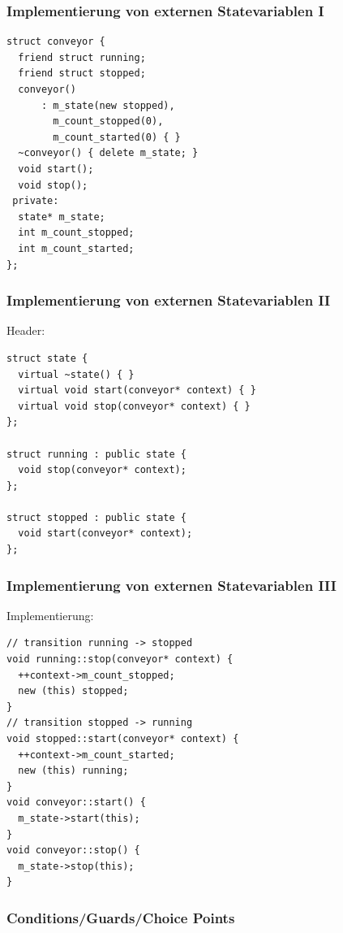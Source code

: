 \documentclass{beamer}
\begin{document}
\begin{frame}[fragile]
 \frametitle{Implementierung von externen Statevariablen I}
 \begin{lstlisting}
struct conveyor {
  friend struct running;
  friend struct stopped;
  conveyor()
      : m_state(new stopped),
        m_count_stopped(0),
        m_count_started(0) { }
  ~conveyor() { delete m_state; }
  void start();
  void stop();
 private:
  state* m_state;
  int m_count_stopped;
  int m_count_started;
};
\end{lstlisting}
\end{frame}

\begin{frame}[fragile]
  \frametitle{Implementierung von externen Statevariablen II}
  Header:
  \begin{lstlisting}
struct state {
  virtual ~state() { }
  virtual void start(conveyor* context) { }
  virtual void stop(conveyor* context) { }
};

struct running : public state {
  void stop(conveyor* context);
};

struct stopped : public state {
  void start(conveyor* context);
};
  \end{lstlisting}

\end{frame}


\begin{frame}[fragile]
  \frametitle{Implementierung von externen Statevariablen III}
  Implementierung:
  \begin{lstlisting}
// transition running -> stopped
void running::stop(conveyor* context) {
  ++context->m_count_stopped;
  new (this) stopped;
}
// transition stopped -> running
void stopped::start(conveyor* context) {
  ++context->m_count_started;
  new (this) running;
}
void conveyor::start() {
  m_state->start(this);
}
void conveyor::stop() {
  m_state->stop(this);
}
  \end{lstlisting}

\end{frame}

\begin{frame}
 \frametitle{Conditions/Guards/Choice Points}
\end{frame}
\end{document}

